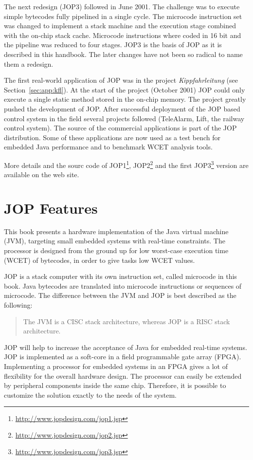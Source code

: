 The next redesign (JOP3) followed in June 2001. The challenge was to
execute simple bytecodes fully pipelined in a single cycle. The
microcode instruction set was changed to implement a stack machine
and the execution stage combined with the on-chip stack cache.
Microcode instructions where coded in 16 bit and the pipeline was
reduced to four stages. JOP3 is the basis of JOP as it is described
in this handbook. The later changes have not been so radical to name
them a redesign.

The first real-world application of JOP was in the project
\emph{Kippfahrleitung} (see Section~\ref{sec:app:kfl}). At the start
of the project (October 2001) JOP could only execute a single static
method stored in the on-chip memory. The project greatly pushed the
development of JOP. After successful deployment of the JOP based
control system in the field several projects followed (TeleAlarm,
Lift, the railway control system). The source of the commercial
applications is part of the JOP distribution. Some of these
applications are now used as a test bench for embedded Java
performance and to benchmark WCET analysis tools.

More details and the sourc code of
JOP1\footnote{\url{http://www.jopdesign.com/jop1.jsp}},
JOP2\footnote{\url{http://www.jopdesign.com/jop2.jsp}} and the first
JOP3\footnote{\url{http://www.jopdesign.com/jop3.jsp}} version are
available on the web site.


\section{JOP Features}

This book presents a hardware implementation of the Java virtual
machine (JVM), targeting small embedded systems with real-time
constraints. The processor is designed from the ground up for low
worst-case execution time (WCET) of bytecodes, in order to give
tasks low WCET values.

JOP is a stack computer with its own instruction set, called
microcode in this book. Java bytecodes are translated into microcode
instructions or sequences of microcode. The difference between the
JVM and JOP is best described as the following:
\begin{quote}
The JVM is a CISC stack architecture, whereas JOP is a RISC stack
architecture.
\end{quote}

JOP will help to increase the acceptance of Java for embedded
real-time systems. JOP is implemented as a soft-core in a field
programmable gate array (FPGA). Implementing a processor for
embedded systems in an FPGA gives a lot of flexibility for the
overall hardware design. The processor can easily be extended by
peripheral components inside the same chip. Therefore, it is
possible to customize the solution exactly to the needs of the
system.

